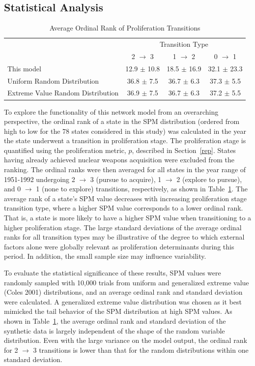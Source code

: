 \documentclass{article} %
\begin{document}
{\subsection{Statistical Analysis}

\begin{table}
\centering
\caption{Average Ordinal Rank of Proliferation Transitions \label{tab:trans}}
\begin{tabular}{l|ccc}
\hline\noalign{\smallskip}
 & \multicolumn{3}{c}{Transition Type}\\
  & 2 $\rightarrow$ 3 & 1 $\rightarrow$ 2  & 0 $\rightarrow$ 1 \\
\noalign{\smallskip}
\hline
\noalign{\smallskip}
This model & 12.9 $\pm$ 10.8 & 18.5 $\pm$ 16.9 & 32.1 $\pm$ 23.3\\
Uniform Random Distribution & 36.8 $\pm$ 7.5 & 36.7 $\pm$ 6.3 & 37.3  $\pm$ 5.5\\
Extreme Value Random Distribution & 36.9 $\pm$ 7.5 & 36.7 $\pm$ 6.3 & 37.2 $\pm$ 5.5 \\
\hline
\end{tabular} 
\end{table}

To explore the functionality of this network model from an overarching perspective, the ordinal rank of a state in the SPM distribution (ordered from high to low for the 78 states considered in this study) was calculated in the year the state underwent a transition in proliferation stage. The proliferation stage is quantified using the proliferation metric, $p$, described in Section~\ref{rep}. States having already achieved nuclear weapons acquisition were excluded from the ranking. The ordinal ranks were then averaged for all states in the year range of 1951-1992 undergoing 2 $\rightarrow$ 3 (pursue to acquire), 1 $\rightarrow$ 2 (explore to pursue), and 0 $\rightarrow$ 1 (none to explore) transitions, respectively, as shown in Table~\ref{tab:trans}. The average rank of a state's SPM value decreases with increasing proliferation stage transition type, where a higher SPM value corresponds to a lower ordinal rank. That is, a state is more likely to have a higher SPM value when transitioning to a higher proliferation stage. The large standard deviations of the average ordinal ranks for all transition types may be illustrative of the degree to which external factors alone were globally relevant as proliferation determinants during this period. In addition, the small sample size may influence variability. 

To evaluate the statistical significance of these results, SPM values were randomly sampled with 10,000 trials from uniform and generalized extreme value (Coles 2001) distributions, and an average ordinal rank and standard deviation were calculated. A generalized extreme value distribution was chosen as it best mimicked the tail behavior of the SPM distribution at high SPM values. As shown in Table~\ref{tab:trans}, the average ordinal rank and standard deviation of the synthetic data is largely independent of the shape of the random variable distribution. Even with the large variance on the model output, the ordinal rank for 2 $\rightarrow$ 3 transitions is lower than that for the random distributions within one standard deviation. 

}
\end{document}
